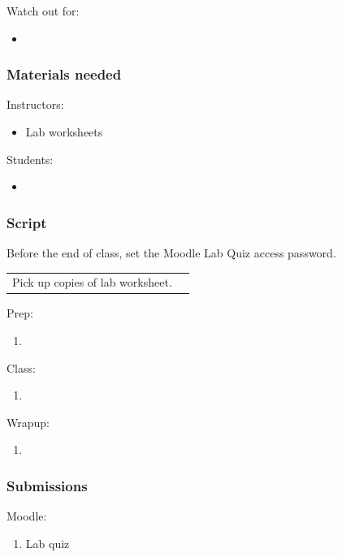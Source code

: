 \documentclass[12pt]{article}
\begin{document}
\noindent
Watch out for:
\begin{itemize}
\item 
\end{itemize}


\subsubsection{Materials needed}

Instructors:
\begin{itemize}
\item Lab worksheets
\end{itemize}

\noindent
Students:
\begin{itemize}
\item 
\end{itemize}


\subsubsection{Script}

Before the end of class, set the Moodle Lab Quiz access password.

\begin{longtable}{m{}m{}}
Pick up copies of lab worksheet. & %

\label{default}
\end{longtable}

Prep:
\begin{enumerate}
\item
\end{enumerate}

\noindent
Class:
\begin{enumerate}
\item
\end{enumerate}

\noindent
Wrapup:
\begin{enumerate}
\item
\end{enumerate}


\subsubsection{Submissions}

Moodle:
\begin{enumerate}
\item Lab quiz
\end{enumerate}
\end{document}

